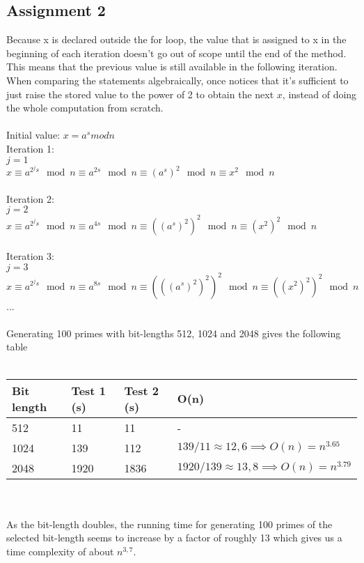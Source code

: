 \documentclass[11pt,a4paper]{article}
\begin{document}
\subsection{Assignment 2}
Because x is declared outside the for loop, the value that is assigned to x in the beginning of each iteration doesn't go out of scope until the end of the method. This means that the previous value is still available in the following iteration. When comparing the statements algebraically, once notices that it's sufficient to just raise the stored value to the power of 2 to obtain the next $x$, instead of doing the whole computation from scratch.
\\\\
Initial value: $x = a^s mod n$ \\
Iteration 1: \\
$j = 1$ \\
$x \equiv a^{ 2^j s } \mod n \equiv a^{ 2s } \mod n \equiv (a^s)^2 \mod n \equiv x^2 \mod n$ \\\\
Iteration 2: \\
$j = 2$ \\
$x \equiv a^{ 2^j s } \mod n \equiv a^{ 4s } \mod n \equiv ((a^s)^2)^2 \mod n \equiv (x^2)^2 \mod n$ \\\\
Iteration 3: \\
$j = 3$ \\
$x \equiv a^{ 2^j s } \mod n \equiv a^{ 8s } \mod n \equiv (((a^s)^2)^2)^2 \mod n \equiv ((x^2)^2)^2 \mod n$ \\
...
\\\\
Generating 100 primes with bit-lengths 512, 1024 and 2048 gives the following table \\\\
\begin{tabular}{ l | l | l | l}
	Bit length & Test 1 (s) & Test 2 (s) & O(n)\\ \hline
	512 & 11 & 11 & -\\
	1024 & 139 & 112 & $139/11 \approx 12,6 \implies O(n) = n^{3.65}$\\
	2048 & 1920 & 1836 & $1920/139 \approx 13,8 \implies O(n) = n^{3.79}$\\
\end{tabular}
\\\\

As the bit-length doubles, the running time for generating 100 primes of the selected bit-length seems to increase by a factor of roughly 13 which gives us a time complexity of about $n^{3,7}$.\\
\end{document}
